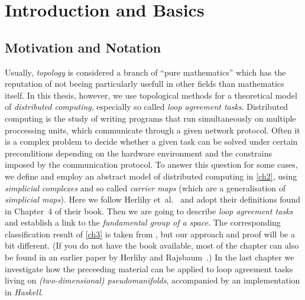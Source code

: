 \chapter{Introduction and Basics}
%
\section{Motivation and Notation}
Usually, \emph{topology} is considered a branch of \enquote{pure mathematics}
which has the reputation of not beeing particularly usefull in other fields than
mathematics itself. In this thesis, however, we use topological methods for
a theoretical model of \emph{distributed computing}, especially so called
\emph{loop agreement tasks}. Distributed computing is the study of writing
programs that run simultaneously on multiple proccessing units, which
communicate through a given network protocol. Often it is a complex problem to
decide whether a given task can be solved under certain preconditions depending
on the hardware environment and the constrains imposed by the communication
protocol. To answer this question for some cases, we define and employ an
abstract model of distributed computing in \cref{ch2}, using \emph{simplicial
complexes} and so called \emph{carrier maps} (which are a generalisation of
\emph{simplicial maps}). Here we follow 
Herlihy et~al.~\cite{bookc:herlihyetal13} and adopt their definitions found
in Chapter~4 of their book. Then we are going to describe \emph{loop agreement
tasks} and establish a link to the \emph{fundamental group of a space}. The
corresponding classification result of \cref{ch3} is taken from
\cite[Chapter~15]{bookc:herlihyetal13}, but our approach and proof will be a bit
different. (If you do not have the book available, most of the chapter can also
be found in an earlier paper by Herlihy and
Rajsbaum~\cite{paper:herlihyrajsbaum03}.) In the last chapter we investigate how
the preceeding material can be applied to loop agreement tasks living on
\emph{(two-dimensional) pseudomanifolds}, accompanied by an implementation in
\emph{Haskell}.

